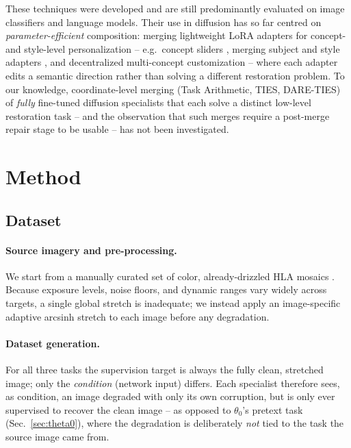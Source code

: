 \documentclass{article}
\begin{document}
These techniques were developed and are still predominantly evaluated on image classifiers and language models. Their use in diffusion has so far centred on \emph{parameter-efficient} composition: merging lightweight LoRA adapters for concept- and style-level personalization -- e.g.\ concept sliders \cite{gandikota2024sliders}, merging subject and style adapters \cite{shah2024ziplora}, and decentralized multi-concept customization \cite{gu2023mixofshow} -- where each adapter edits a semantic direction rather than solving a different restoration problem. To our knowledge, coordinate-level merging (Task Arithmetic, TIES, DARE-TIES) of \emph{fully} fine-tuned diffusion specialists that each solve a distinct low-level restoration task -- and the observation that such merges require a post-merge repair stage to be usable -- has not been investigated.

\section{Method}
\label{sec:method}

\subsection{Dataset}
\label{sec:data}

\paragraph*{Source imagery and pre-processing.} We start from a manually curated set of color, already-drizzled HLA mosaics \cite{hla}. Because exposure levels, noise floors, and dynamic ranges vary widely across targets, a single global stretch is inadequate; we instead apply an image-specific adaptive arcsinh stretch to each image before any degradation.

\paragraph*{Dataset generation.} For all three tasks the supervision target is always the fully clean, stretched image; only the \emph{condition} (network input) differs. Each specialist therefore sees, as condition, an image degraded with only its own corruption, but is only ever supervised to recover the clean image -- as opposed to $\theta_0$'s pretext task (Sec.~\ref{sec:theta0}), where the degradation is deliberately \emph{not} tied to the task the source image came from.
\end{document}
